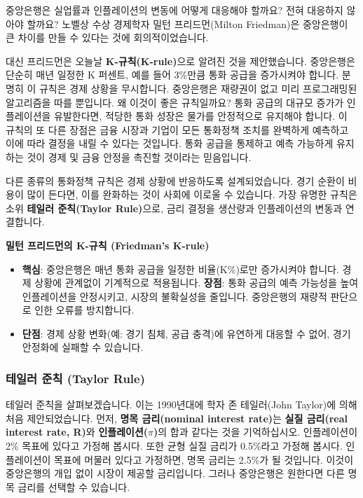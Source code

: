 \documentclass[11pt,a4paper]{article}
\theoremstyle{definition}
\begin{document}
중앙은행은 실업률과 인플레이션의 변동에 어떻게 대응해야 할까요? 전혀 대응하지 않아야 할까요? 노벨상 수상 경제학자 밀턴 프리드먼(Milton Friedman)은 중앙은행이 큰 차이를 만들 수 있다는 것에 회의적이었습니다.

대신 프리드먼은 오늘날 \textbf{K-규칙(K-rule)}으로 알려진 것을 제안했습니다. 중앙은행은 단순히 매년 일정한 K 퍼센트, 예를 들어 3\%만큼 통화 공급을 증가시켜야 합니다. 분명히 이 규칙은 경제 상황을 무시합니다. 중앙은행은 재량권이 없고 미리 프로그래밍된 알고리즘을 따를 뿐입니다. 왜 이것이 좋은 규칙일까요? 통화 공급의 대규모 증가가 인플레이션을 유발한다면, 적당한 통화 성장은 물가를 안정적으로 유지해야 합니다. 이 규칙의 또 다른 장점은 금융 시장과 기업이 모든 통화정책 조치를 완벽하게 예측하고 이에 따라 결정을 내릴 수 있다는 것입니다. 통화 공급을 통제하고 예측 가능하게 유지하는 것이 경제 및 금융 안정을 촉진할 것이라는 믿음입니다.

다른 종류의 통화정책 규칙은 경제 상황에 반응하도록 설계되었습니다. 경기 순환이 비용이 많이 든다면, 이를 완화하는 것이 사회에 이로울 수 있습니다. 가장 유명한 규칙은 소위 \textbf{테일러 준칙(Taylor Rule)}으로, 금리 결정을 생산량과 인플레이션의 변동과 연결합니다.

\begin{conceptbox}
\textbf{밀턴 프리드먼의 K-규칙 (Friedman's K-rule)}
\begin{itemize}
    \item \textbf{핵심}: 중앙은행은 매년 통화 공급을 일정한 비율(K\%)로만 증가시켜야 합니다. 경제 상황에 관계없이 기계적으로 적용됩니다.
    \textbf{장점}: 통화 공급의 예측 가능성을 높여 인플레이션을 안정시키고, 시장의 불확실성을 줄입니다. 중앙은행의 재량적 판단으로 인한 오류를 방지합니다.
    \item \textbf{단점}: 경제 상황 변화(예: 경기 침체, 공급 충격)에 유연하게 대응할 수 없어, 경기 안정화에 실패할 수 있습니다.
\end{itemize}
\end{conceptbox}

\subsubsection*{테일러 준칙 (Taylor Rule)}

테일러 준칙을 살펴보겠습니다. 이는 1990년대에 학자 존 테일러(John Taylor)에 의해 처음 제안되었습니다. 먼저, \textbf{명목 금리(nominal interest rate)}는 \textbf{실질 금리(real interest rate, R)}와 \textbf{인플레이션($\pi$)}의 합과 같다는 것을 기억하십시오. 인플레이션이 2\% 목표에 있다고 가정해 봅시다. 또한 균형 실질 금리가 0.5\%라고 가정해 봅시다. 인플레이션이 목표에 머물러 있다고 가정하면, 명목 금리는 2.5\%가 될 것입니다. 이것이 중앙은행의 개입 없이 시장이 제공할 금리입니다. 그러나 중앙은행은 원한다면 다른 명목 금리를 선택할 수 있습니다.
\end{document}
